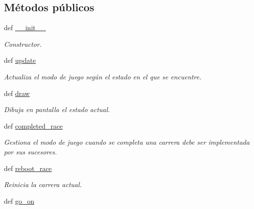 \subsection*{\-Métodos públicos}
\begin{DoxyCompactItemize}
\item 
def \hyperlink{classengine_1_1modes_1_1Mode_abaa804386b783e4b0e6f7438b329b64f}{\-\_\-\-\_\-init\-\_\-\-\_\-}
\begin{DoxyCompactList}\small\item\em \-Constructor. \end{DoxyCompactList}\item 
\hypertarget{classengine_1_1modes_1_1Mode_a0eae2319565b5eaccb2a7ce45692bcf5}{
def \hyperlink{classengine_1_1modes_1_1Mode_a0eae2319565b5eaccb2a7ce45692bcf5}{update}}
\label{classengine_1_1modes_1_1Mode_a0eae2319565b5eaccb2a7ce45692bcf5}

\begin{DoxyCompactList}\small\item\em \-Actualiza el modo de juego según el estado en el que se encuentre. \end{DoxyCompactList}\item 
def \hyperlink{classengine_1_1modes_1_1Mode_a73b75c100896e1713f3f9940fe7e9e5e}{draw}
\begin{DoxyCompactList}\small\item\em \-Dibuja en pantalla el estado actual. \end{DoxyCompactList}\item 
\hypertarget{classengine_1_1modes_1_1Mode_a3ed32e53402e9454fb2693e257f4d7dd}{
def \hyperlink{classengine_1_1modes_1_1Mode_a3ed32e53402e9454fb2693e257f4d7dd}{completed\-\_\-race}}
\label{classengine_1_1modes_1_1Mode_a3ed32e53402e9454fb2693e257f4d7dd}

\begin{DoxyCompactList}\small\item\em \-Gestiona el modo de juego cuando se completa una carrera debe ser implementada por sus sucesores. \end{DoxyCompactList}\item 
\hypertarget{classengine_1_1modes_1_1Mode_a2e63ce782c119de2fcd0e6faa64a64e2}{
def \hyperlink{classengine_1_1modes_1_1Mode_a2e63ce782c119de2fcd0e6faa64a64e2}{reboot\-\_\-race}}
\label{classengine_1_1modes_1_1Mode_a2e63ce782c119de2fcd0e6faa64a64e2}

\begin{DoxyCompactList}\small\item\em \-Reinicia la carrera actual. \end{DoxyCompactList}\item 
\hypertarget{classengine_1_1modes_1_1Mode_a213943b3e71c1c07f1bbc144265694c7}{
def \hyperlink{classengine_1_1modes_1_1Mode_a213943b3e71c1c07f1bbc144265694c7}{go\-\_\-on}}
\label{classengine_1_1modes_1_1Mode_a213943b3e71c1c07f1bbc144265694c7}


\end{DoxyCompactItemize}
